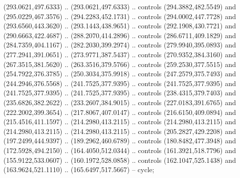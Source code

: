 \begin{scope}[shift={(407.03862,-246.29561)}]
    (293.0621,497.6333) .. (293.0621,497.6333) .. controls (294.3882,482.5549) and
    (295.0229,467.3576) .. (294.2283,452.1731) .. controls (294.0002,447.7728) and
    (293.6560,443.3620) .. (293.1443,438.9651) .. controls (292.1908,430.7721) and
    (290.6663,422.4687) .. (288.2070,414.2896) .. controls (286.6711,409.1829) and
    (284.7359,404.1167) .. (282.2030,399.2974) .. controls (279.9940,395.0893) and
    (277.2941,391.0651) .. (273.9771,387.5437) .. controls (270.9352,384.3160) and
    (267.3515,381.5620) .. (263.3516,379.5766) .. controls (259.2530,377.5515) and
    (254.7922,376.3785) .. (250.3034,375.9918) .. controls (247.2579,375.7493) and
    (244.2946,376.5568) .. (241.7525,377.9395) .. controls (241.7525,377.9395) and
    (241.7525,377.9395) .. (241.7525,377.9395) .. controls (238.4315,379.7403) and
    (235.6826,382.2622) .. (233.2607,384.9015) .. controls (227.0183,391.6765) and
    (222.2002,399.3654) .. (217.8067,407.0147) .. controls (216.6150,409.0894) and
    (215.4516,411.1597) .. (214.2980,413.2115) .. controls (214.2980,413.2115) and
    (214.2980,413.2115) .. (214.2980,413.2115) .. controls (205.2827,429.2208) and
    (197.2499,444.9397) .. (189.2962,460.6789) .. controls (180.8482,477.3948) and
    (172.5928,494.2150) .. (164.4050,512.0344) .. controls (161.3921,518.7796) and
    (155.9122,533.0607) .. (160.1972,528.0858) .. controls (162.1047,525.1438) and
    (163.9624,521.1110) .. (165.6497,517.5667) -- cycle;


\end{scope}
